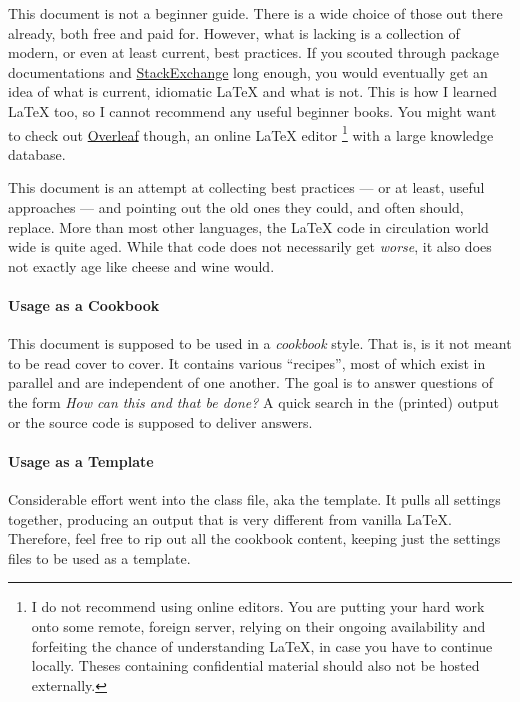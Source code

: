
This document is not a beginner guide.
There is a wide choice of those out there already, both free and paid for.
However, what is lacking is a collection of modern, or even at least current,
best practices.
If you scouted through package documentations and
\href{https://tex.stackexchange.com/}{StackExchange}
long enough, you would eventually get an idea of what is current, idiomatic \LaTeX{}
and what is not.
This is how I learned \LaTeX{} too, so I cannot recommend any useful beginner books.
You might want to check out \href{https://www.overleaf.com/}{Overleaf} though,
an online \LaTeX{} editor%
\footnote{%
    I do not recommend using online editors.
    You are putting your hard work onto some remote, foreign server, relying on
    their ongoing availability and forfeiting the chance of understanding \LaTeX{},
    in case you have to continue locally.
    Theses containing confidential material should also not be hosted externally.
}
with a large knowledge database.

This document is an attempt at collecting best practices
--- or at least, useful approaches ---
and pointing out the old ones they could, and often should, replace.
More than most other languages, the \LaTeX{} code in circulation world wide is
quite aged.
While that code does not necessarily get \emph{worse}, it also does not exactly
age like cheese and wine would.

\paragraph{Usage as a Cookbook}
This document is supposed to be used in a \emph{cookbook} style.
That is, is it not meant to be read cover to cover.
It contains various \enquote{recipes}, most of which exist in parallel and
are independent of one another.
The goal is to answer questions of the form \emph{How can this and that be done?}
A quick search in the (printed) output or the source code is supposed to deliver
answers.

\paragraph{Usage as a Template}
Considerable effort went into the class file, aka the template.
It pulls all settings together, producing an output that is very different from
vanilla \LaTeX{}.
Therefore, feel free to rip out all the cookbook content, keeping just the settings
files to be used as a template.

